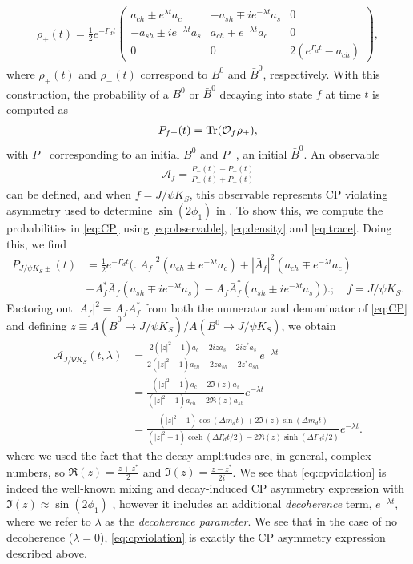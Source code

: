 \begin{align}
\label{eq:density}
\rho_{\pm}(t) = \frac{1}{2}e^{-\Gamma_d t}\begin{pmatrix}
a_{ch} \pm e^{\lambda t}a_c & -a_{sh}\mp ie^{-\lambda t}a_s & 0 \\
-a_{sh} \pm ie^{-\lambda t}a_s & a_{ch}\mp e^{-\lambda t}a_c & 0 \\
0 & 0 & 2(e^{\Gamma_d t}-a_{ch})
\end{pmatrix},
\end{align}
where $\rho_+(t)$ and $\rho_-(t)$ correspond to $B^0$ and $\bar{B}^0$, respectively. With this construction, the probability of a $B^0$ or $\bar{B}^0$ decaying into state $f$ at time $t$ is computed as
\begin{align}
\label{eq:trace}
P_{f\pm}(t) = \Tr(\mathcal{O}_f\mathcal{\rho_\pm}),
\end{align}
with $P_+$ corresponding to an initial $B^0$ and $P_-$, an initial $\bar{B}^0$. An observable
\begin{align}
\label{eq:CP}
\mathcal{A}_f =\frac{P_-(t)-P_+(t)}{P_-(t)+P_+(t)}
\end{align}
can be defined, and when $f = J/\psi K_S$, this observable represents CP violating asymmetry used to determine $\sin(2\phi_1)$ in \cite{Abe1}. To show this, we compute the probabilities in \ref{eq:CP} using \ref{eq:observable}, \ref{eq:density} and \ref{eq:trace}. Doing this, we find
\begin{align}
\label{eq:probs}
P_{J/\psi K_S\pm}(t) &= \frac{1}{2}e^{-\Gamma_d t}\Bigg( \Bigg.|A_f|^2(a_{ch}\pm e^{-\lambda t}a_c)+|\bar{A}_f|^2(a_{ch}\mp e^{-\lambda t}a_c) \nonumber\\  &-A_f^*\bar{A}_f(a_{sh}\mp ie^{-\lambda t}a_s) - A_f\bar{A}_f^*(a_{sh}\pm ie^{-\lambda t}a_s)\Bigg) \Bigg. ;\quad f=J/\psi K_S.
\end{align}
Factoring out $|A_f|^2=A_fA_f^*$ from both the numerator and denominator of \ref{eq:CP} and defining $z\equiv A(\bar{B}^0\rightarrow J/\psi K_S)/A(B^0\rightarrow J/\psi K_S)$, we obtain
\begin{align}
\label{eq:cpviolation}
\mathcal{A}_{J/\Psi K_S}(t,\lambda)&=\frac{2(|z|^2-1)a_c - 2iz a_s + 2iz^*a_s}{2(|z|^2+1)a_{ch} -2z a_{sh} -2z^*a_{sh}}e^{-\lambda t}\nonumber\\
&=\frac{(|z|^2-1)a_c + 2\Im(z)a_s}{(|z|^2+1)a_{ch} -2\Re(z) a_{sh}}e^{-\lambda t}\nonumber\\
&=\frac{(|z|^2-1)\cos(\Delta m_d t) + 2\Im(z)\sin(\Delta m_d t)}{(|z|^2+1)\cosh(\Delta \Gamma_d t/2) -2\Re(z) \sinh(\Delta\Gamma_d t/2)}e^{-\lambda t}.
\end{align}
where we used the fact that the decay amplitudes are, in general, complex numbers, so $\Re(z)=\frac{z+z^*}{2}$ and $\Im(z) = \frac{z-z^*}{2i}$. We see that \ref{eq:cpviolation} is indeed the well-known mixing and decay-induced CP asymmetry expression with $\Im(z)\approx \sin(2\phi_1)$ \cite{Abe1,Abe2}, however it includes an additional \textit{decoherence} term, $e^{-\lambda t}$, where we refer to $\lambda$ as the \textit{decoherence parameter}. We see that in the case of no decoherence ($\lambda = 0$), \ref{eq:cpviolation} is exactly the CP asymmetry expression described above.

